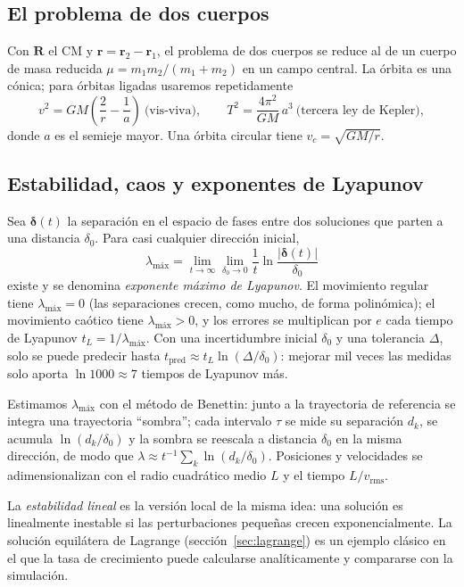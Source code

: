 \documentclass[11pt,a4paper]{article}
\newcommand{\vect}[1]{\mathbf{#1}}
\begin{document}
\subsection{El problema de dos cuerpos}

Con $\vect R$ el CM y $\vect r=\vect r_2-\vect r_1$, el problema de dos cuerpos se reduce
al de un cuerpo de masa reducida $\mu=m_1m_2/(m_1+m_2)$ en un campo central. La órbita es
una cónica; para órbitas ligadas usaremos repetidamente
\begin{equation}
  v^2=GM\left(\frac{2}{r}-\frac1a\right)\ \text{(vis-viva)},\qquad
  T^2=\frac{4\pi^2}{GM}\,a^3\ \text{(tercera ley de Kepler)},
\end{equation}
donde $a$ es el semieje mayor. Una órbita circular tiene $v_c=\sqrt{GM/r}$.

\subsection{Estabilidad, caos y exponentes de Lyapunov}\label{sec:chaos}

Sea $\boldsymbol\delta(t)$ la separación en el espacio de fases entre dos soluciones que
parten a una distancia $\delta_0$. Para casi cualquier dirección inicial,
\begin{equation}
  \lambda_\text{máx}=\lim_{t\to\infty}\lim_{\delta_0\to0}\frac1t\ln\frac{|\boldsymbol\delta(t)|}{\delta_0}
\end{equation}
existe y se denomina \emph{exponente máximo de Lyapunov}. El movimiento regular tiene
$\lambda_\text{máx}=0$ (las separaciones crecen, como mucho, de forma polinómica); el
movimiento caótico tiene $\lambda_\text{máx}>0$, y los errores se multiplican por $e$ cada
tiempo de Lyapunov $t_L=1/\lambda_\text{máx}$. Con una incertidumbre inicial $\delta_0$ y
una tolerancia $\Delta$, solo se puede predecir hasta
$t_\text{pred}\approx t_L\ln(\Delta/\delta_0)$: mejorar mil veces las medidas solo aporta
$\ln 1000\approx7$ tiempos de Lyapunov más.

Estimamos $\lambda_\text{máx}$ con el método de Benettin: junto a la trayectoria de
referencia se integra una trayectoria ``sombra''; cada intervalo $\tau$ se mide su
separación $d_k$, se acumula $\ln(d_k/\delta_0)$ y la sombra se reescala a distancia
$\delta_0$ en la misma dirección, de modo que $\lambda\approx t^{-1}\sum_k\ln(d_k/\delta_0)$.
Posiciones y velocidades se adimensionalizan con el radio cuadrático medio $L$ y el tiempo
$L/v_\text{rms}$.

La \emph{estabilidad lineal} es la versión local de la misma idea: una solución es
linealmente inestable si las perturbaciones pequeñas crecen exponencialmente. La solución
equilátera de Lagrange (sección~\ref{sec:lagrange}) es un ejemplo clásico en el que la tasa
de crecimiento puede calcularse analíticamente y compararse con la simulación.
\end{document}

